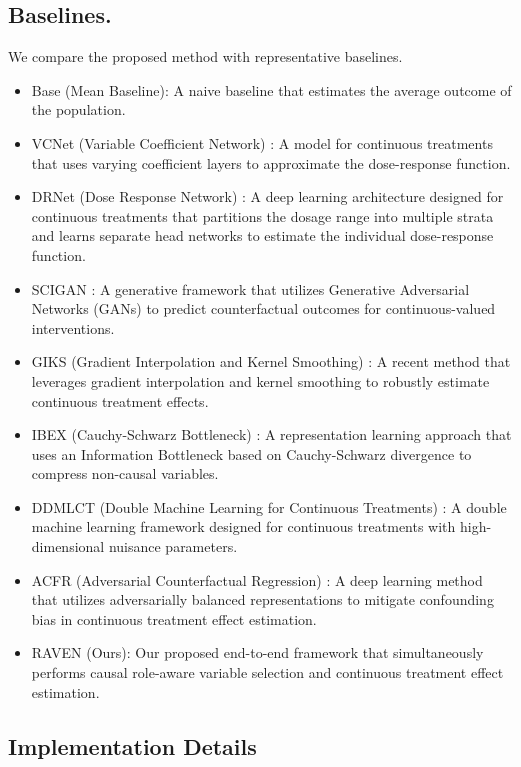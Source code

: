 \documentclass[twoside]{article}
\theoremstyle{plain}
\theoremstyle{definition}
\theoremstyle{remark}
\newtheorem{proof sketch}[theorem]{Proof Sketch}
\begin{document}
\subsection{Baselines.}
We compare the proposed method with representative baselines.
\begin{itemize}
    \item Base (Mean Baseline): A naive baseline that estimates the average outcome of the population.
    \item VCNet (Variable Coefficient Network) \citep{nie2021vcnet}: A model for continuous treatments that uses varying coefficient layers to approximate the dose-response function. 
    \item DRNet (Dose Response Network) \citep{schwab2020learning}: A deep learning architecture designed for continuous treatments that partitions the dosage range into multiple strata and learns separate head networks to estimate the individual dose-response function.
    \item SCIGAN \citep{bica2020estimating}: A generative framework that utilizes Generative Adversarial Networks (GANs) to predict counterfactual outcomes for continuous-valued interventions. 
    \item GIKS (Gradient Interpolation and Kernel Smoothing) \citep{nagalapatti2024continuous}: A recent method that leverages gradient interpolation and kernel smoothing to robustly estimate continuous treatment effects.
    \item IBEX (Cauchy-Schwarz Bottleneck) \citep{van2026continuous}: A representation learning approach that uses an Information Bottleneck based on Cauchy-Schwarz divergence to compress non-causal variables.
    \item DDMLCT (Double Machine Learning for Continuous Treatments) \citep{colangelo2025double}: A double machine learning framework designed for continuous treatments with high-dimensional nuisance parameters.
    \item ACFR (Adversarial Counterfactual Regression) \citep{kazemi2024adversarially}: A deep learning method that utilizes adversarially balanced representations to mitigate confounding bias in continuous treatment effect estimation.
    \item RAVEN (Ours): Our proposed end-to-end framework that simultaneously performs causal role-aware variable selection and continuous treatment effect estimation. 
\end{itemize}

\subsection{Implementation Details}
\end{document}
